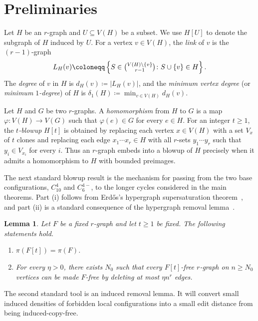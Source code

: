 \documentclass[10pt,a4paper]{article}
\theoremstyle{plain}
\newtheorem{lemma}[lemma]{Lemma}
\theoremstyle{definition}
\begin{document}
\section{Preliminaries}\label{SEC:Preliminaries}

Let $H$ be an $r$-graph and $U\subseteq V(H)$ be a subset.
We use $H[U]$ to denote the subgraph of $H$ induced by $U$.  For a vertex $v\in V(H)$, the \emph{link} of $v$ is the $(r-1)$-graph
\[
L_H(v)\coloneqq\left\{S\in\tbinom{V(H)\setminus\{v\}}{r-1}\colon S\cup\{v\}\in H\right\}.
\]
The \emph{degree} of $v$ in $H$ is $d_H(v)\coloneqq |L_H(v)|$, and the \emph{minimum vertex degree} (or \emph{minimum $1$-degree}) of $H$ is $\delta_1(H)\coloneqq \min_{v\in V(H)} d_H(v)$. 


Let $H$ and $G$ be two $r$-graphs.  A \emph{homomorphism} from $H$ to $G$ is a map $\varphi:V(H)\to V(G)$ such that $\varphi(e)\in G$ for every $e\in H$.  For an integer $t\ge 1$, the \emph{$t$-blowup} $H[t]$ is obtained by replacing each vertex $x\in V(H)$ with a set $V_x$ of $t$ clones and replacing each edge $x_1\cdots x_r\in H$ with all $r$-sets $y_1\cdots y_r$ such that $y_i\in V_{x_i}$ for every $i$.  Thus an $r$-graph embeds into a blowup of $H$ precisely when it admits a homomorphism to $H$ with bounded preimages.

The next standard blowup result is the mechanism for passing from the two base configurations, $C_{10}^4$ and $C_6^{4-}$, to the longer cycles considered in the main theorems.
Part \textup{(i)} follows from Erd\H{o}s's hypergraph supersaturation theorem~\cite{Erdos67a}, and part \textup{(ii)} is a standard consequence of the hypergraph removal lemma~\cite{RS09}.

\begin{lemma}\label{LEM:blowup_lemma}
Let $F$ be a fixed $r$-graph and let $t\ge1$ be fixed.
The following statements hold.
\begin{enumerate}[label=\textup{(\roman*)}]
\item $\pi(F[t])=\pi(F)$.
\item For every $\eta>0$, there exists $N_0$ such that every $F[t]$-free $r$-graph on $n\ge N_0$ vertices can be made $F$-free by deleting at most $\eta n^r$ edges.
\end{enumerate}
\end{lemma}

The second standard tool is an induced removal lemma.
It will convert small induced densities of forbidden local configurations into a small edit distance from being induced-copy-free.
\end{document}
